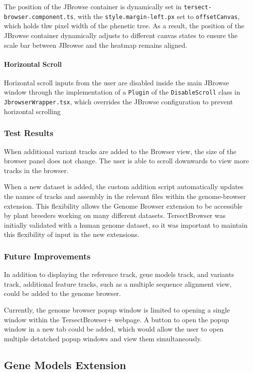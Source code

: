 \documentclass[12pt]{article}
\begin{document}
The position of the JBrowse container is dynamically set in \verb+tersect-browser.component.ts+, with the \verb+style.margin-left.px+ set to \verb+offsetCanvas+, which holds thw pixel width of the phenetic tree. As a result, the position of the JBrowse container dynamically adjusts to different canvas states to ensure the scale bar between JBrowse and the heatmap remains aligned. 

\paragraph{Horizontal Scroll}
Horizontal scroll inputs from the user are disabled inside the main JBrowse window through the implementation of a \verb+Plugin+ of the \verb+DisableScroll+ class in \verb+JbrowserWrapper.tsx+, which overrides the JBrowse configuration to prevent horizontal scrolling

\subsubsection{Test Results}
When additional variant tracks are added to the Browser view, the size of the browser panel does not change. The user is able to scroll downwards to view more tracks in the browser. 

When a new dataset is added, the custom addition script automatically updates the names of tracks and assembly in the relevant files within the genome-browser extension. This flexibility allows the Genome Browser extension to be accessible by plant breeders working on many different datasets. TersectBrowser was initially validated with a human genome dataset, so it was important to maintain this flexibility of input in the new extensions.

\subsubsection{Future Improvements}
In addition to displaying the reference track, gene models track, and variants track, additional feature tracks, such as a multiple sequence alignment view, could be added to the genome browser.

Currently, the genome browser popup window is limited to opening a single window within the TersectBrowser+ webpage. A button to open the popup window in a new tab could be added, which would allow the user to open multiple detatched popup windows and view them simultaneously.


\subsection{Gene Models Extension}
\label{sec:Models}
\end{document}
